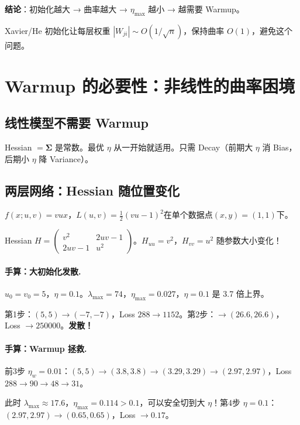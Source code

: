 \documentclass[12pt, a4paper]{ctexart}
\begin{document}
\textbf{结论}：初始化越大 → 曲率越大 → $\eta_{\max}$ 越小 → 越需要 Warmup。

Xavier/He 初始化让每层权重 $|W_{ji}| \sim O(1/\sqrt{n})$，保持曲率 $O(1)$，避免这个问题。


\section{Warmup 的必要性：非线性的曲率困境}

\subsection{线性模型不需要 Warmup}

Hessian $= \boldsymbol{\Sigma}$ 是常数。最优 $\eta$ 从一开始就适用。只需 Decay（前期大 $\eta$ 消 Bias，后期小 $\eta$ 降 Variance）。

\subsection{两层网络：Hessian 随位置变化}

$f(x;u,v) = vux$，$L(u,v) = \frac{1}{2}(vu-1)^2$在单个数据点$(x,y) = (1,1)$下。

Hessian $H = \begin{pmatrix} v^2 & 2uv-1 \\ 2uv-1 & u^2 \end{pmatrix}$。$H_{uu}=v^2$，$H_{vv}=u^2$ 随参数大小变化！

\paragraph{手算：大初始化发散.} $u_0=v_0=5$，$\eta=0.1$。$\lambda_{\max}=74$，$\eta_{\max}=0.027$，$\eta=0.1$ 是 3.7 倍上界。

第1步：$(5,5)\to(-7,-7)$，Loss $288\to 1152$。第2步：$\to(26.6,26.6)$，Loss $\to 250000$。\textbf{发散！}

\paragraph{手算：Warmup 拯救.} 前3步 $\eta_w=0.01$：$(5,5)\to(3.8,3.8)\to(3.29,3.29)\to(2.97,2.97)$，Loss $288\to 90\to 48\to 31$。

此时 $\lambda_{\max}\approx 17.6$，$\eta_{\max}=0.114>0.1$，可以安全切到大 $\eta$！第4步 $\eta=0.1$：$(2.97,2.97)\to(0.65,0.65)$，Loss $\to 0.17$。
\end{document}
